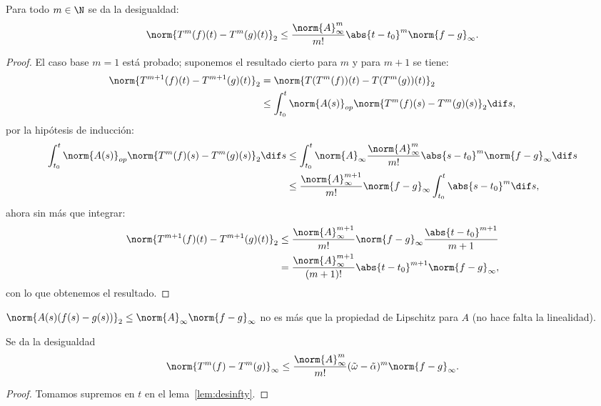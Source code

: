 \documentclass[../main.tex]{subfiles}
\begin{document}
\begin{lemma}\label{lem:desinfty}
	Para todo \(m \in \N\) se da la desigualdad:
	\[\norm{T^m(f)(t) - T^m(g)(t)}_2 \leq 
		\frac{\norm{A}^m_\infty}{m!} \abs{t - t_0}^m \norm{f - g}_\infty.\]
\end{lemma}

\begin{proof}
	El caso base \(m = 1\) está probado; suponemos el resultado cierto para 
	\(m\) y para \(m + 1\) se tiene:
	\begin{align*}
		\norm{T^{m + 1}(f)(t) - T^{m + 1}(g)(t)}_2 
		&= \norm{T(T^m(f))(t) - T(T^m (g))(t)}_2 \\
		&\leq \int_{t_0}^t \norm{A(s)}_{op} 
			\norm{T^m(f)(s) - T^m (g)(s)}_2 \dif s,
	\end{align*}
	por la hipótesis de inducción:
	\begin{align*}
		\int_{t_0}^t \norm{A(s)}_{op} 
			\norm{T^m(f)(s) - T^m (g)(s)}_2 \dif s
		&\leq \int_{t_0}^t \norm{A}_\infty 
			\frac{\norm{A}^m_\infty}{m!} \abs{s - t_0}^m 
			\norm{f - g}_\infty \dif s \\
		&\leq \frac{\norm{A}^{m + 1}_\infty}{m!} \norm{f - g}_\infty 
			\int_{t_0}^t \abs{s - t_0}^m \dif s,
	\end{align*}
	ahora sin más que integrar:
	\begin{align*}
		\norm{T^{m + 1}(f)(t) - T^{m + 1}(g)(t)}_2 &\leq
		\frac{\norm{A}^{m + 1}_\infty}{m!} \norm{f - g}_\infty 
			\frac{\abs{t - t_0}^{m + 1}}{m + 1}\\
		&= \frac{\norm{A}^{m + 1}_\infty}{(m + 1)!} \abs{t - t_0}^{m + 1} 
			\norm{f - g}_\infty,
	\end{align*}
	con lo que obtenemos el resultado.
\end{proof}

\begin{remark}
  \(\norm{A(s)(f(s)-g(s))}_2 \leq \norm{A}_\infty \norm{f-g}_\infty\) no es más
  que la propiedad de Lipschitz para \(A\) (no hace falta la linealidad).
\end{remark}

\begin{corollary}
	Se da la desigualdad
	\[\norm{T^m(f) - T^m(g)}_\infty \leq 
		\frac{\norm{A}^m_\infty}{m!} (\tilde{\omega} - \tilde{\alpha})^m
		\norm{f - g}_\infty.\]
\end{corollary}

\begin{proof}
	Tomamos supremos en \(t\) en el lema~\ref{lem:desinfty}.
\end{proof}
\end{document}
